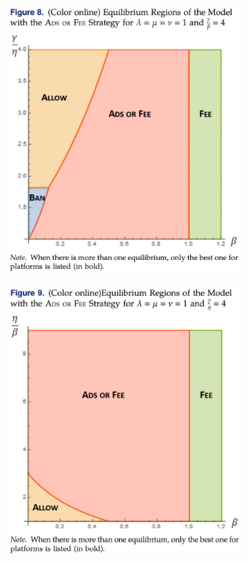 \documentclass{beamer}
\begin{document}
\begin{frame}
\begin{figure}
\begin{subfigure}[b]{0.3\textwidth}
            \includegraphics[width=\textwidth]{f8}
        \end{subfigure}
        \hfill
        \begin{subfigure}[b]{0.3\textwidth}
            \centering
            \includegraphics[width=\textwidth]{f9}

\end{subfigure}
\end{figure}
\end{frame}
\end{document}
